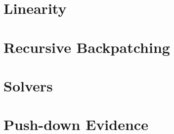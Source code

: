\chapter{Linearity}
\label{ch:linearity}


\chapter{Recursive Backpatching}
\label{ch:recursive-backpatching}


\chapter{Solvers}
\label{ch:solvers}


\chapter{Push-down Evidence}
\label{ch:push-down-evidence}


